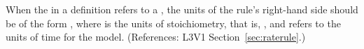 When the  in a \RateRule definition refers to a
\SpeciesReference, the units of the rule's right-hand side should be of the
form , where  is the units of
stoichiometry, that is, , and  refers
to the units of time for the model.  (References: L3V1
Section~\ref{sec:raterule}.)
